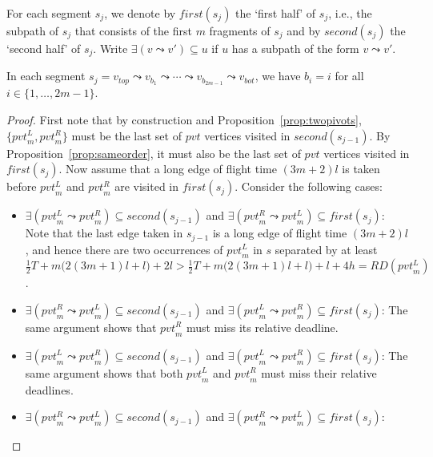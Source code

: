 \documentclass[envcountsame]{llncs}
\begin{document}
For each segment $s_j$, we denote by $\mathit{first}(s_j)$ the `first half' of $s_j$, i.e., the subpath
of $s_j$ that consists of the first $m$ fragments of $s_j$ and by $\mathit{second}(s_j)$ the `second half' of $s_j$.
Write $\exists (v \leadsto v') \subseteq u$ if $u$ has a subpath of the form $v \leadsto v'$.

\begin{proposition}\label{prop:inorder}
In each segment $s_j = v_{top} \leadsto v_{b_1} \leadsto \cdots \leadsto v_{b_{2m - 1}} \leadsto v_{bot}$,
we have $b_i = i$ for all $i \in \{1, \ldots, 2m - 1\}$.
\end{proposition}
\begin{proof}
First note that by construction and Proposition~\ref{prop:twopivots}, $\{\mathit{pvt}_m^L, \mathit{pvt}_m^R\}$ must be the last set of $\mathit{pvt}$ vertices visited in $\mathit{second}(s_{j - 1})$.
By Proposition~\ref{prop:sameorder}, it must also be the last set of $\mathit{pvt}$ vertices visited in $\mathit{first}(s_j)$.
Now assume that a long edge of flight time $(3m + 2)l$ is taken before $\mathit{pvt}_m^L$ and $\mathit{pvt}_m^R$ are visited
in $\mathit{first}(s_j)$.
Consider the following cases:
\begin{itemize}
\item $\exists (\mathit{pvt}_m^L \leadsto \mathit{pvt}_m^R) \subseteq \mathit{second}(s_{j-1})$ and $\exists (\mathit{pvt}_m^R \leadsto \mathit{pvt}_m^L) \subseteq \mathit{first}(s_{j})$:
Note that the last edge taken in $s_{j-1}$ is a long edge of flight time $(3m + 2)l$,
and hence there are two occurrences of $\mathit{pvt}_m^L$ in $s$ separated by at least
$\frac{1}{2}T + m\big(2 (3m+1)l + l\big) + 2l > \frac{1}{2}T + m\big(2 (3m+1)l + l\big) + l + 4h = \mathit{RD}(\mathit{pvt}_m^L)$.
\item $\exists (\mathit{pvt}_m^R \leadsto \mathit{pvt}_m^L) \subseteq \mathit{second}(s_{j-1})$ and $\exists (\mathit{pvt}_m^L \leadsto \mathit{pvt}_m^R) \subseteq \mathit{first}(s_{j})$:
The same argument shows that $\mathit{pvt}_m^R$ must miss its relative deadline.
\item $\exists (\mathit{pvt}_m^L \leadsto \mathit{pvt}_m^R) \subseteq \mathit{second}(s_{j-1})$ and $\exists (\mathit{pvt}_m^L \leadsto \mathit{pvt}_m^R) \subseteq \mathit{first}(s_{j})$:
The same argument shows that both $\mathit{pvt}_m^L$ and $\mathit{pvt}_m^R$ must miss their relative deadlines.
\item $\exists (\mathit{pvt}_m^R \leadsto \mathit{pvt}_m^L) \subseteq \mathit{second}(s_{j-1})$ and $\exists (\mathit{pvt}_m^R \leadsto \mathit{pvt}_m^L) \subseteq \mathit{first}(s_{j})$:

\end{itemize}
\end{proof}
\end{document}
